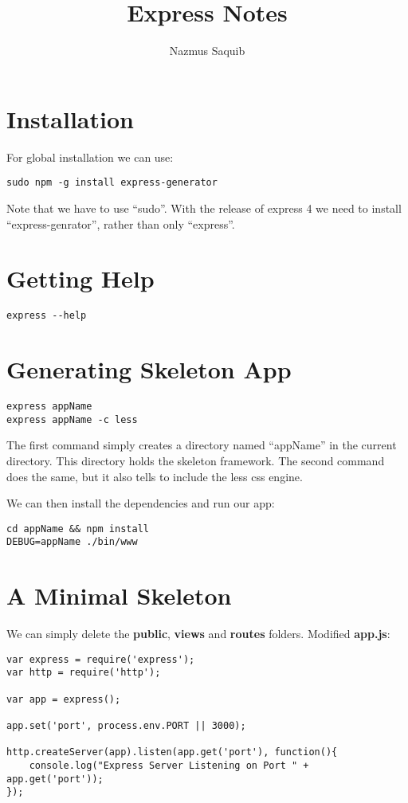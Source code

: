 \documentclass[a4paper, 12pt]{article}
\begin{document}
\title{Express Notes}
\author{Nazmus Saquib}

\maketitle
\tableofcontents

\section{Installation}
For global installation we can use:
\begin{verbatim}
sudo npm -g install express-generator
\end{verbatim}
Note that we have to use ``sudo''. With the release of express 4 we need to install ``express-genrator'', rather than only ``express''.

\section{Getting Help}
\begin{verbatim}
express --help
\end{verbatim}

\section{Generating Skeleton App}
\begin{verbatim}
express appName
express appName -c less
\end{verbatim}
The first command simply creates a directory named ``appName'' in the current directory. This directory holds the skeleton framework. The second command does the same, but it also tells to include the less css engine.

We can then install the dependencies and run our app:
\begin{verbatim}
cd appName && npm install
DEBUG=appName ./bin/www
\end{verbatim}

\section{A Minimal Skeleton}
We can simply delete the \textbf{public}, \textbf{views} and \textbf{routes} folders. Modified \textbf{app.js}:
\begin{verbatim}
var express = require('express');
var http = require('http');

var app = express();

app.set('port', process.env.PORT || 3000);	

http.createServer(app).listen(app.get('port'), function(){
	console.log("Express Server Listening on Port " + app.get('port'));
});
\end{verbatim}
\end{document}
